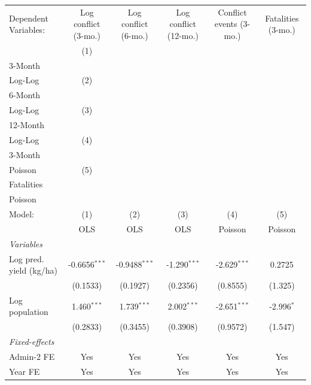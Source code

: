 
\begingroup
\centering
\begin{tabular}{lccccc}
   \tabularnewline \midrule \midrule
   Dependent Variables:    & Log conflict (3-mo.)      & Log conflict (6-mo.)      & Log conflict (12-mo.)      & Conflict events (3-mo.)   & Fatalities (3-mo.)\\  
                           & (1)\\3-Month\\Log-Log     & (2)\\6-Month\\Log-Log     & (3)\\12-Month\\Log-Log     & (4)\\3-Month\\Poisson     & (5)\\Fatalities\\Poisson \\       
   Model:                  & (1)                       & (2)                       & (3)                        & (4)                       & (5)\\  
                           &  OLS                      & OLS                       & OLS                        & Poisson                   & Poisson\\  
   \midrule
   \emph{Variables}\\
   Log pred. yield (kg/ha) & -0.6656$^{***}$           & -0.9488$^{***}$           & -1.290$^{***}$             & -2.629$^{***}$            & 0.2725\\   
                           & (0.1533)                  & (0.1927)                  & (0.2356)                   & (0.8555)                  & (1.325)\\   
   Log population          & 1.460$^{***}$             & 1.739$^{***}$             & 2.002$^{***}$              & -2.651$^{***}$            & -2.996$^{*}$\\   
                           & (0.2833)                  & (0.3455)                  & (0.3908)                   & (0.9572)                  & (1.547)\\   
   \midrule
   \emph{Fixed-effects}\\
   Admin-2 FE              & Yes                       & Yes                       & Yes                        & Yes                       & Yes\\  
   Year FE                 & Yes                       & Yes                       & Yes                        & Yes                       & Yes\\  

\end{tabular}
